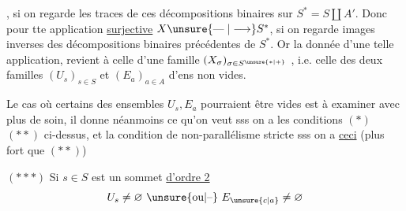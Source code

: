 , si on regarde les traces de ces décompositions binaires sur $S^\ast=S\amalg A'$. Donc pour tte application \uline{surjective} $X\unsure{\mathrel{\text{---}}|\longrightarrow}S^\ast$, si on regarde  images inverses des décompositions binaires précédentes de $S^\ast$. Or la donnée d'une telle application, revient à celle d'une famille $(X_\sigma)_{\sigma\in S^{\unsure{\ast|+}}}$ , i.e.  celle des deux familles $(U_s)_{s\in S}$ et $(E_a)_{a\in A}$ d'ens non vides.

Le cas où certains des ensembles $U_s,E_a$ pourraient être vides est à examiner avec plus de soin, il donne néanmoins ce qu'on veut sss on a les conditions $(\ast)$ $(\ast\ast)$ ci-dessus, et la condition de non-parallélisme stricte sss on a \uline{ceci} (plus fort que $(\ast\ast)$)

$(\ast\ast\ast)$ Si $s\in S$ est un sommet \uline{d'ordre 2}    
\[
U_s\ne\varnothing\ \unsure{\text{ou}|\text{--}}\ E_{\unsure{c|a}}\ne\varnothing
\]
